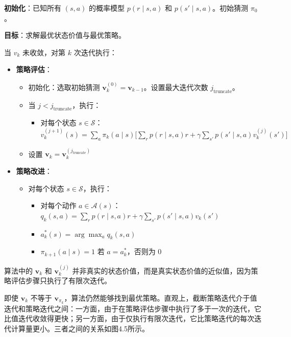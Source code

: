 \documentclass[UTF8]{article}
\begin{document}
\begin{algobox}[4.3 截断策略迭代算法]
\textbf{初始化}：已知所有 $(s,a)$ 的概率模型 $p(r \mid s,a)$ 和 $p(s' \mid s,a)$。初始猜测 $\pi_0$。

\textbf{目标}：求解最优状态价值与最优策略。

当 $v_k$ 未收敛，对第 $k$ 次迭代执行：
\begin{itemize}
    \item \textbf{策略评估}：
    \begin{itemize}
        \item 初始化：选取初始猜测 $\boldsymbol{v}_k^{(0)} = \boldsymbol{v}_{k-1}$。设置最大迭代次数 $j_{\text{truncate}}$。
        \item 当 $j < j_{\text{truncate}}$，执行：
        \begin{itemize}
            \item 对每个状态 $s \in \mathcal{S}$：
            \quad $v_k^{(j+1)}(s) = \sum_{a} \pi_k(a \mid s) \bigl[ \sum_{r} p(r \mid s,a) r + \gamma \sum_{s'} p(s' \mid s,a) v_k^{(j)}(s') \bigr]$
        \end{itemize}
        \item 设置 $\boldsymbol{v}_k = \boldsymbol{v}_k^{(j_{\text{truncate}})}$
    \end{itemize}
    \item \textbf{策略改进}：
    \begin{itemize}
        \item 对每个状态 $s \in \mathcal{S}$，执行：
        \begin{itemize}
            \item 对每个动作 $a \in \mathcal{A}(s)$：
            \quad $q_k(s,a) = \sum_{r} p(r \mid s,a) r + \gamma \sum_{s'} p(s' \mid s,a) v_k(s')$
            \item $a_k^*(s) = \arg\max_a q_k(s,a)$
            \item $\pi_{k+1}(a \mid s) = 1$ 若 $a = a_k^*$，否则为 $0$
        \end{itemize}
    \end{itemize}
\end{itemize}
\end{algobox}

\begin{remarkbox}
算法中的 $\boldsymbol{v}_k$ 和 $\boldsymbol{v}_k^{(j)}$ 并非真实的状态价值，而是真实状态价值的近似值，因为策略评估步骤只执行了有限次迭代。

即使 $\boldsymbol{v}_k$ 不等于 $\boldsymbol{v}_{\pi_k}$，算法仍然能够找到最优策略。直观上，截断策略迭代介于值迭代和策略迭代之间：一方面，由于在策略评估步骤中执行了多于一次的迭代，它比值迭代收敛得更快；另一方面，由于仅执行有限次迭代，它比策略迭代的每次迭代计算量更小。三者之间的关系如图4.5所示。
\end{remarkbox}
\end{document}
